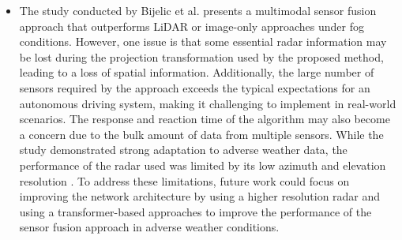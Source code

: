 \documentclass[rnd]{mas_proposal}
\begin{document}
\begin{itemize}
      \item The study conducted by Bijelic et al. \cite{bijelic2020seeing} presents a multimodal sensor fusion approach that outperforms LiDAR or image-only approaches under fog conditions. However, one issue is that some essential radar information may be lost during the projection transformation used by the proposed method, leading to a loss of spatial information. Additionally, the large number of sensors required by the approach exceeds the typical expectations for an autonomous driving system, making it challenging to implement in real-world scenarios. The response and reaction time of the algorithm may also become a concern due to the bulk amount of data from multiple sensors. While the study demonstrated strong adaptation to adverse weather data, the performance of the radar used was limited by its low azimuth and elevation resolution \cite{Zhang2021Dec}. To address these limitations, future work could focus on improving the network architecture by using a higher resolution radar and using a transformer-based approaches to improve the performance of the sensor fusion approach in adverse weather conditions.


\end{itemize}
\end{document}
